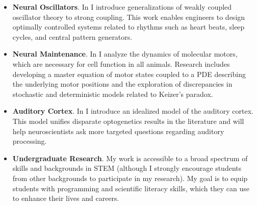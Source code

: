\documentclass[a4paper,11pt]{article}
\begin{document}
	\begin{itemize}
		\item \textbf{Neural Oscillators}. In \cite{park2021high} I introduce generalizations of weakly coupled oscillator theory to strong coupling. This work enables engineers to design optimally controlled systems related to rhythms such as heart beats, sleep cycles, and central pattern generators.
		\item \textbf{Neural Maintenance}. In \cite{park2021coarse,park2020dynamics} I analyze the dynamics of molecular motors, which are necessary for cell function in all animals. Research includes developing a master equation of motor states coupled to a PDE describing the underlying motor positions and the exploration of discrepancies in stochastic and deterministic models related to Keizer's paradox.
		\item \textbf{Auditory Cortex}. In \cite{park2020circuit} I introduce an idealized model of the auditory cortex. This model unifies disparate optogenetics results in the literature and will help neuroscientists ask more targeted questions regarding auditory processing.
		\item \textbf{Undergraduate Research}. My work is accessible to a broad spectrum of skills and backgrounds in STEM (although I strongly encourage students from other backgrounds to participate in my research). My goal is to equip students with programming and scientific literacy skills, which they can use to enhance their lives and careers.
	\end{itemize}
	
	\newpage

	
	
	
	
\end{document}

